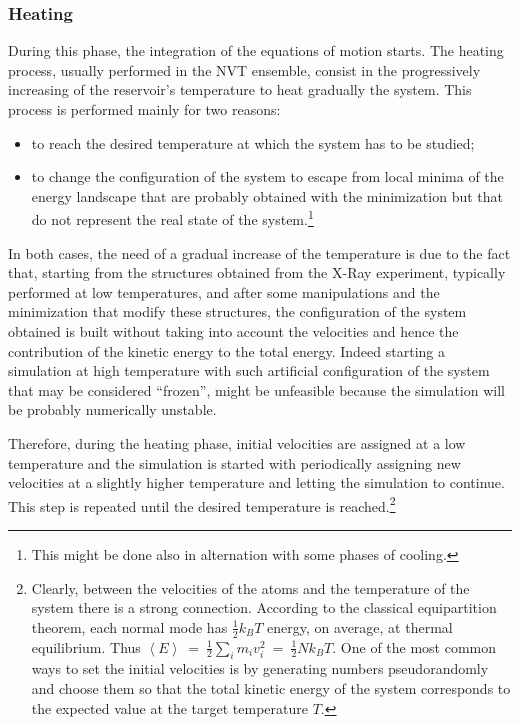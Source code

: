 \subsubsection{Heating}
During this phase, the integration of the equations of motion starts.
The heating process, usually performed in the NVT ensemble, consist in the progressively increasing of  the reservoir's temperature to heat gradually the system. This process is performed mainly for two reasons:
\begin{itemize}
\item to reach the desired temperature at which the system has to be studied;
\item to change the configuration of the system to escape from local minima of the energy landscape that are probably obtained with the minimization but that do not represent the real state of the system.\footnote{This might be done also in alternation with some phases of cooling.}
\end{itemize}
In both cases, the need of a gradual increase of the temperature is due to the fact that, starting from the structures obtained from the X-Ray experiment, typically performed at low temperatures, and after some manipulations and the minimization that modify these structures, the configuration of the system obtained is built without taking into account the velocities and hence the contribution of the kinetic energy to the total energy. Indeed starting a simulation at high temperature with such artificial configuration of the system that may be considered ``frozen'', might be unfeasible because the simulation will be probably numerically unstable.

Therefore, during the heating phase, initial velocities are assigned at a low temperature and the simulation is started with periodically assigning new velocities at a slightly higher temperature and letting the simulation to continue. This step is repeated until the desired temperature is reached.\footnote{Clearly, between the velocities of the atoms and the temperature of the system there is a strong connection. According to the classical equipartition theorem, each normal mode has $\frac{1}{2} k_B T$ energy, on average, at thermal equilibrium. Thus $\left< E \right> \:=\: \frac{1}{2}\sum_i m_i v_i^2 \:=\: \frac{1}{2} N k_B T$.
One of the most common ways to set the initial velocities is by generating numbers pseudorandomly and choose them so that the total kinetic energy of the system corresponds to the expected value at the target temperature $T$.} 


